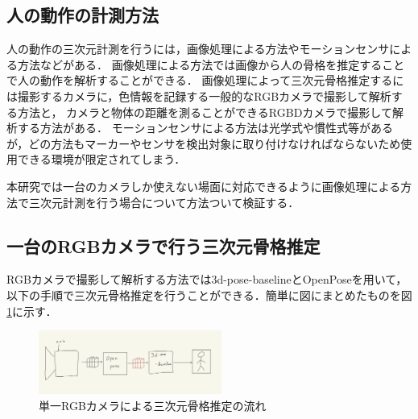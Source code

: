 \documentclass[titlepage]{jarticle}
\begin{document}
\subsection{人の動作の計測方法}
%
人の動作の三次元計測を行うには，画像処理による方法やモーションセンサによる方法などがある．
画像処理による方法では画像から人の骨格を推定することで人の動作を解析することができる．
画像処理によって三次元骨格推定するには撮影するカメラに，色情報を記録する一般的なRGBカメラで撮影して解析する方法と，
カメラと物体の距離を測ることができるRGBDカメラで撮影して解析する方法がある．
モーションセンサによる方法は光学式や慣性式等があるが，どの方法もマーカーやセンサを検出対象に取り付けなければならないため使用できる環境が限定されてしまう．

本研究では一台のカメラしか使えない場面に対応できるように画像処理による方法で三次元計測を行う場合について方法ついて検証する．

%
%
\subsection{一台のRGBカメラで行う三次元骨格推定}
%
RGBカメラで撮影して解析する方法では3d-pose-baseline\cite{baseline}とOpenPose\cite{openpose}を用いて，
以下の手順で三次元骨格推定を行う\cite{ビデオ}ことができる．簡単に図にまとめたものを図\ref{RGB}に示す．

\begin{figure}[!h]
  \centering
  \includegraphics[width=6cm]{img/RGBcamera.jpg}
  \caption{単一RGBカメラによる三次元骨格推定の流れ}
  \label{RGB}
\end{figure}
\end{document}
